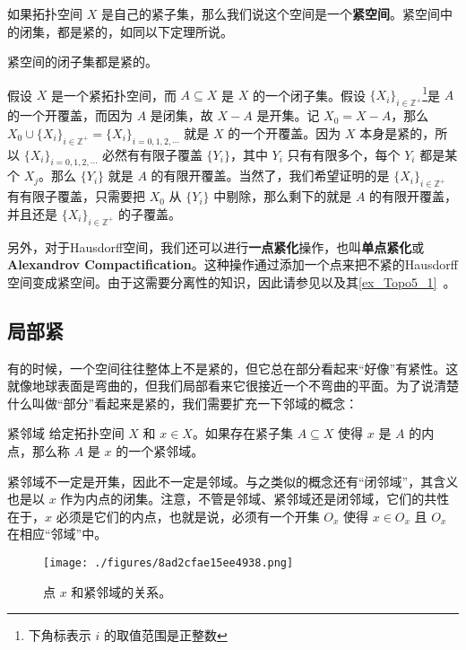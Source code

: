 如果拓扑空间 $X$ 是自己的紧子集，那么我们说这个空间是一个\textbf{紧空间}。紧空间中的闭集，都是紧的，如同以下定理所说。

\begin{theorem}{}\label{the_Topo2_2}
紧空间的闭子集都是紧的。
\end{theorem}

假设 $X$ 是一个紧拓扑空间，而 $A\subseteq X$ 是 $X$ 的一个闭子集。假设 $\{X_i\}_{i\in \mathbb{Z}^+}$\footnote{下角标表示 $i$ 的取值范围是正整数}是 $A$ 的一个开覆盖，而因为 $A$ 是闭集，故 $X-A$ 是开集。记 $X_0=X-A$，那么 $X_0\cup\{X_i\}_{i\in \mathbb{Z}^+}=\{X_i\}_{i=0, 1, 2, \cdots}$ 就是 $X$ 的一个开覆盖。因为 $X$ 本身是紧的，所以 $\{X_i\}_{i=0, 1, 2, \cdots}$ 必然有有限子覆盖 $\{Y_i\}$，其中 $Y_i$ 只有有限多个，每个 $Y_i$ 都是某个 $X_j$。那么 $\{Y_i\}$ 就是 $A$ 的有限开覆盖。当然了，我们希望证明的是 $\{X_i\}_{i\in \mathbb{Z}^+}$ 有有限子覆盖，只需要把 $X_0$ 从 $\{Y_i\}$ 中剔除，那么剩下的就是 $A$ 的有限开覆盖，并且还是 $\{X_i\}_{i\in \mathbb{Z}^+}$ 的子覆盖。

另外，对于Hausdorff空间，我们还可以进行\textbf{一点紧化}操作，也叫\textbf{单点紧化}或\textbf{Alexandrov Compactification}。这种操作通过添加一个点来把不紧的Hausdorff空间变成紧空间。由于这需要分离性的知识，因此请参见以及其\autoref{ex_Topo5_1}~。

\subsection{局部紧}

有的时候，一个空间往往整体上不是紧的，但它总在部分看起来“好像”有紧性。这就像地球表面是弯曲的，但我们局部看来它很接近一个不弯曲的平面。为了说清楚什么叫做“部分”看起来是紧的，我们需要扩充一下邻域的概念：

\begin{definition}{紧邻域}
给定拓扑空间 $X$ 和 $x\in X$。如果存在紧子集 $A\subseteq X$ 使得 $x$ 是 $A$ 的内点，那么称 $A$ 是 $x$ 的一个紧邻域。
\end{definition}

紧邻域不一定是开集，因此不一定是邻域。与之类似的概念还有“闭邻域”，其含义也是以 $x$ 作为内点的闭集。注意，不管是邻域、紧邻域还是闭邻域，它们的共性在于，$x$ 必须是它们的内点，也就是说，必须有一个开集 $O_x$ 使得 $x\in O_x$ 且 $O_x$ 在相应“邻域”中。

\begin{figure}[ht]
\centering
\texttt{[image: ./figures/8ad2cfae15ee4938.png]}
\caption{点 $x$ 和紧邻域的关系。} \label{fig_Topo2_1}
\end{figure}

